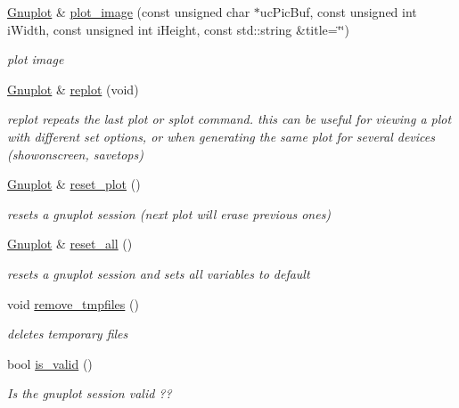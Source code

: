 \begin{DoxyCompactItemize}
\item 
\mbox{\hyperlink{class_gnuplot}{Gnuplot}} \& \mbox{\hyperlink{class_gnuplot_aae22c0470a6fbbc1f5e84dec8d023381}{plot\+\_\+image}} (const unsigned char $\ast$uc\+Pic\+Buf, const unsigned int i\+Width, const unsigned int i\+Height, const std\+::string \&title=\char`\"{}\char`\"{})
\begin{DoxyCompactList}\small\item\em plot image \end{DoxyCompactList}\item 
\mbox{\hyperlink{class_gnuplot}{Gnuplot}} \& \mbox{\hyperlink{class_gnuplot_a34c1b3e877d246a841a29f857a29f502}{replot}} (void)
\begin{DoxyCompactList}\small\item\em replot repeats the last plot or splot command. this can be useful for viewing a plot with different set options, or when generating the same plot for several devices (showonscreen, savetops) \end{DoxyCompactList}\item 
\mbox{\label{class_gnuplot_a6797761712d3c311e3685bcccba65dd4}} 
\mbox{\hyperlink{class_gnuplot}{Gnuplot}} \& \mbox{\hyperlink{class_gnuplot_a6797761712d3c311e3685bcccba65dd4}{reset\+\_\+plot}} ()
\begin{DoxyCompactList}\small\item\em resets a gnuplot session (next plot will erase previous ones) \end{DoxyCompactList}\item 
\mbox{\label{class_gnuplot_a9aedfe8371083a1a3ac2b9493810049c}} 
\mbox{\hyperlink{class_gnuplot}{Gnuplot}} \& \mbox{\hyperlink{class_gnuplot_a9aedfe8371083a1a3ac2b9493810049c}{reset\+\_\+all}} ()
\begin{DoxyCompactList}\small\item\em resets a gnuplot session and sets all variables to default \end{DoxyCompactList}\item 
\mbox{\label{class_gnuplot_a2e449552587b0055f40f4ee079d62a8d}} 
void \mbox{\hyperlink{class_gnuplot_a2e449552587b0055f40f4ee079d62a8d}{remove\+\_\+tmpfiles}} ()
\begin{DoxyCompactList}\small\item\em deletes temporary files \end{DoxyCompactList}\item 
bool \mbox{\hyperlink{class_gnuplot_a3135ffebb308b50c4f3178a62b23ab03}{is\+\_\+valid}} ()
\begin{DoxyCompactList}\small\item\em Is the gnuplot session valid ?? \end{DoxyCompactList}\end{DoxyCompactItemize}
